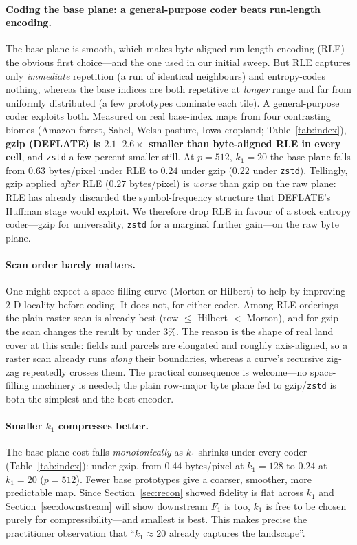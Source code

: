 \documentclass[11pt]{article}
\begin{document}
\paragraph{Coding the base plane: a general-purpose coder beats run-length encoding.}
The base plane is smooth, which makes byte-aligned run-length encoding (RLE) the
obvious first choice---and the one used in our initial sweep. But RLE captures only
\emph{immediate} repetition (a run of identical neighbours) and entropy-codes
nothing, whereas the base indices are both repetitive at \emph{longer} range and
far from uniformly distributed (a few prototypes dominate each tile). A
general-purpose coder exploits both. Measured on real base-index maps from four
contrasting biomes (Amazon forest, Sahel, Welsh pasture, Iowa cropland;
Table~\ref{tab:index}), \textbf{gzip (DEFLATE) is $2.1$--$2.6\times$ smaller than
byte-aligned RLE in every cell}, and \texttt{zstd} a few percent smaller still. At
$p=512,\,k_1=20$ the base plane falls from $0.63$ bytes/pixel under RLE to $0.24$
under gzip ($0.22$ under \texttt{zstd}). Tellingly, gzip applied \emph{after} RLE
($0.27$ bytes/pixel) is \emph{worse} than gzip on the raw plane: RLE has already
discarded the symbol-frequency structure that DEFLATE's Huffman stage would
exploit. We therefore drop RLE in favour of a stock entropy coder---gzip for
universality, \texttt{zstd} for a marginal further gain---on the raw byte plane.

\paragraph{Scan order barely matters.}
One might expect a space-filling curve (Morton or Hilbert) to help by improving
2-D locality before coding. It does not, for either coder. Among RLE orderings the
plain raster scan is already best (row $\le$ Hilbert $<$ Morton), and for gzip the
scan changes the result by under $3\%$. The reason is the shape of real land cover
at this scale: fields and parcels are elongated and roughly axis-aligned, so a
raster scan already runs \emph{along} their boundaries, whereas a curve's recursive
zig-zag repeatedly crosses them. The practical consequence is welcome---no
space-filling machinery is needed; the plain row-major byte plane fed to
gzip/\texttt{zstd} is both the simplest and the best encoder.

\paragraph{Smaller $k_1$ compresses better.}
The base-plane cost falls \emph{monotonically} as $k_1$ shrinks under every coder
(Table~\ref{tab:index}): under gzip, from $0.44$ bytes/pixel at $k_1=128$ to
$0.24$ at $k_1=20$ ($p=512$). Fewer base prototypes give a coarser, smoother, more
predictable map. Since Section~\ref{sec:recon} showed fidelity is flat across
$k_1$ and Section~\ref{sec:downstream} will show downstream $F_1$ is too, $k_1$ is
free to be chosen purely for compressibility---and smallest is best. This makes
precise the practitioner observation that ``$k_1\approx20$ already captures the
landscape''.
\end{document}
